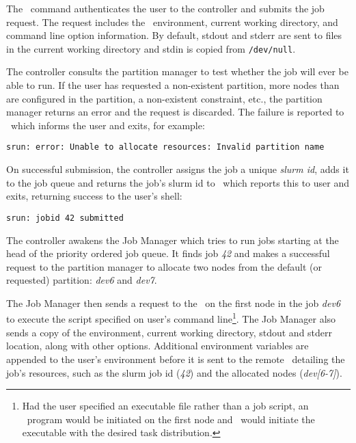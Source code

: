The \srun\ command authenticates the user to the controller and submits
the job request. 
The request includes the \srun\ environment, current working directory, 
and command line option information. By default, stdout and stderr are
sent to files in the current working directory and stdin is copied from
{\tt /dev/null}.

The controller consults the partition manager to test whether the job 
will ever be able to run.  If the user has requested a non-existent partition,
more nodes than are configured in the partition, a non-existent constraint, 
etc., the partition manager returns an error and the request is discarded.
The failure is reported to \srun\ which informs the user and exits, for example:
\begin{verbatim}
srun: error: Unable to allocate resources: Invalid partition name
\end{verbatim}

On successful submission, the controller assigns the job a unique 
{\em slurm id}, adds it to the job queue and returns the job's
slurm id to \srun\, which reports this to user and exits, returning
success to the user's shell:

\begin{verbatim}
srun: jobid 42 submitted
\end{verbatim}

The controller awakens the Job Manager which tries to run
jobs starting at the head of the priority ordered job queue.  It finds job {\em 42}
and makes a successful request to the partition manager to allocate 
two nodes from the default (or requested) partition: {\em dev6} and 
{\em dev7}.

The Job Manager then sends a request to the \slurmd\ on the first node 
in the job {\em dev6} to execute the script specified on user's
command line\footnote{Had the user specified an executable file rather 
than a job script, an \srun\ program would be initiated on the first 
node and \srun\ would initiate the executable with the desired task distribution.}.
The Job Manager also sends a 
copy of the environment, current working directory, stdout and stderr location,
along with other options. Additional environment variables are appended
to the user's environment before it is sent to the remote \slurmd\ detailing
the job's resources, such as the slurm job id ({\em 42}) and the
allocated nodes ({\em dev[6-7]}).

